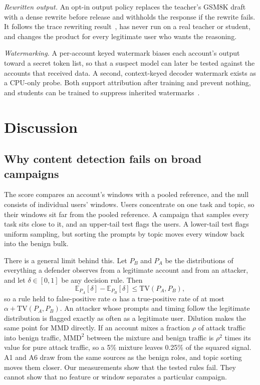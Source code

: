 \documentclass[journal]{IEEEtran}
\begin{document}
\textit{Rewritten output.} An opt-in output policy replaces the teacher's GSM8K draft with a dense rewrite before release and withholds the response if the rewrite fails. It follows the trace rewriting result~\cite{ma2026tracerewriting}, has never run on a real teacher or student, and changes the product for every legitimate user who wants the reasoning.

\textit{Watermarking.} A per-account keyed watermark biases each account's output toward a secret token list, so that a suspect model can later be tested against the accounts that received data. A second, context-keyed decoder watermark exists as a CPU-only probe. Both support attribution after training and prevent nothing, and students can be trained to suppress inherited watermarks~\cite{pan2025watermarks}.

\section{Discussion}
\label{sec:discussion}
\subsection{Why content detection fails on broad campaigns}
The score compares an account's windows with a pooled reference, and the null consists of individual users' windows. Users concentrate on one task and topic, so their windows sit far from the pooled reference. A campaign that samples every task sits close to it, and an upper-tail test flags the users. A lower-tail test flags uniform sampling, but sorting the prompts by topic moves every window back into the benign bulk.

There is a general limit behind this. Let $P_B$ and $P_A$ be the distributions of everything a defender observes from a legitimate account and from an attacker, and let $\delta\in[0,1]$ be any decision rule. Then
\begin{equation}
\mathbb E_{P_A}[\delta]-\mathbb E_{P_B}[\delta]\leq\mathrm{TV}(P_A,P_B),
\end{equation}
so a rule held to false-positive rate $\alpha$ has a true-positive rate of at most $\alpha+\mathrm{TV}(P_A,P_B)$. An attacker whose prompts and timing follow the legitimate distribution is flagged exactly as often as a legitimate user. Dilution makes the same point for MMD directly. If an account mixes a fraction $\rho$ of attack traffic into benign traffic, $\mathrm{MMD}^2$ between the mixture and benign traffic is $\rho^2$ times its value for pure attack traffic, so a 5\% mixture leaves 0.25\% of the squared signal. A1 and A6 draw from the same sources as the benign roles, and topic sorting moves them closer. Our measurements show that the tested rules fail. They cannot show that no feature or window separates a particular campaign.
\end{document}

